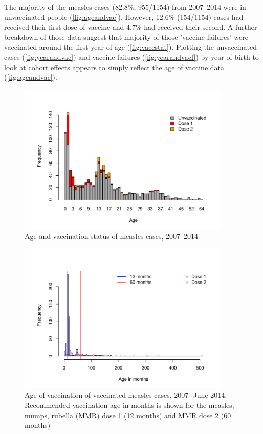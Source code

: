 \documentclass{article}
\begin{document}
The majority of the measles cases (82.8\%, 955/1154) from 2007--2014 were in unvaccinated people (\autoref{fig:ageandvac}). However, 12.6\% (154/1154) cases had received their first dose of vaccine and 4.7\% had received their second. A further breakdown of those data suggest that majority of those 'vaccine failures' were vaccinated around the first year of age (\autoref{fig:vaccstat}). Plotting the unvaccinated cases (\autoref{fig:yearandvac}) and vaccine failures (\autoref{fig:yearandvacf}) by year of birth to look at cohort effects appears to simply reflect the age of vaccine data (\autoref{fig:ageandvac}).

\begin{figure}
\begin{center}
     \includegraphics[width=0.9\textwidth]{vacc_status.pdf}
\end{center}
\caption{Age and vaccination status of measles cases, 2007--2014}
\label{fig:ageandvac}
\end{figure}

\begin{figure}
\begin{center}
     \includegraphics[width=0.9\textwidth]{vacc_age.pdf}
\end{center}
\caption{Age of vaccination of vaccinated measles cases, 2007- June 2014. Recommended vaccination age in months is shown for the measles, mumps, rubella (MMR) dose 1 (12 months) and MMR dose 2 (60 months)}
\label{fig:vaccstat}
\end{figure}
\end{document}
